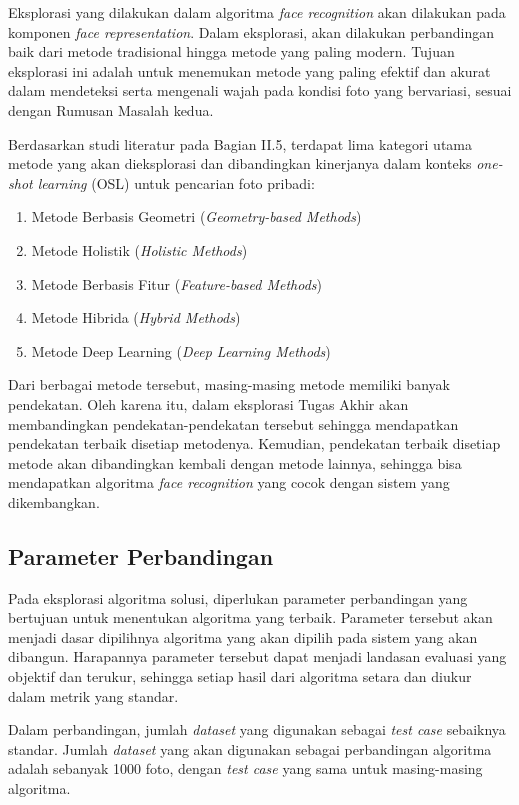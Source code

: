 Eksplorasi yang dilakukan dalam algoritma \textit{face recognition} akan dilakukan pada komponen \textit{face representation}. Dalam eksplorasi, akan dilakukan perbandingan baik dari metode tradisional hingga metode yang paling modern. Tujuan eksplorasi ini adalah untuk menemukan metode yang paling efektif dan akurat dalam mendeteksi serta mengenali wajah pada kondisi foto yang bervariasi, sesuai dengan Rumusan Masalah kedua.

Berdasarkan studi literatur pada Bagian II.5, terdapat lima kategori utama metode yang akan dieksplorasi dan dibandingkan kinerjanya dalam konteks \textit{one-shot learning} (OSL) untuk pencarian foto pribadi:

\begin{enumerate}
  \item Metode Berbasis Geometri (\textit{Geometry-based Methods})
  \item Metode Holistik (\textit{Holistic Methods})
  \item Metode Berbasis Fitur (\textit{Feature-based Methods})
  \item Metode Hibrida (\textit{Hybrid Methods})
  \item Metode Deep Learning (\textit{Deep Learning Methods})
\end{enumerate}

Dari berbagai metode tersebut, masing-masing metode memiliki banyak pendekatan. Oleh karena itu, dalam eksplorasi Tugas Akhir akan membandingkan pendekatan-pendekatan tersebut sehingga mendapatkan pendekatan terbaik disetiap metodenya. Kemudian, pendekatan terbaik disetiap metode akan dibandingkan kembali dengan metode lainnya, sehingga bisa mendapatkan algoritma \textit{face recognition} yang cocok dengan sistem yang dikembangkan. 

\subsection{Parameter Perbandingan}

Pada eksplorasi algoritma solusi, diperlukan parameter perbandingan yang bertujuan untuk menentukan algoritma yang terbaik. Parameter tersebut akan menjadi dasar dipilihnya algoritma yang akan dipilih pada sistem yang akan dibangun. Harapannya parameter tersebut dapat menjadi landasan evaluasi yang objektif dan terukur, sehingga setiap hasil dari algoritma setara dan diukur dalam metrik yang standar.

Dalam perbandingan, jumlah \textit{dataset} yang digunakan sebagai \textit{test case} sebaiknya standar. Jumlah \textit{dataset} yang akan digunakan sebagai perbandingan algoritma adalah sebanyak 1000 foto, dengan \textit{test case} yang sama untuk masing-masing algoritma.

